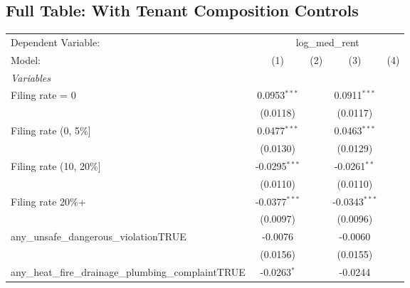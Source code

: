 \documentclass[
  11pt,
]{article}
\begin{document}
\begin{adjustbox}{max width=\textwidth}
\end{adjustbox}

\subsection{Full Table: With Tenant Composition
Controls}\label{full-table-with-tenant-composition-controls}

\begin{adjustbox}{max width=\textwidth}
\begingroup
\centering
\begin{tabular}{lcccc}
   \tabularnewline \midrule \midrule
   Dependent Variable: & \multicolumn{4}{c}{log\_med\_rent}\\
   Model:                                                  & (1)             & (2)             & (3)             & (4)\\  
   \midrule
   \emph{Variables}\\
   Filing rate = 0                                         & 0.0953$^{***}$  &                 & 0.0911$^{***}$  &   \\   
                                                           & (0.0118)        &                 & (0.0117)        &   \\   
   Filing rate (0, 5\%]                                    & 0.0477$^{***}$  &                 & 0.0463$^{***}$  &   \\   
                                                           & (0.0130)        &                 & (0.0129)        &   \\   
   Filing rate (10, 20\%]                                  & -0.0295$^{***}$ &                 & -0.0261$^{**}$  &   \\   
                                                           & (0.0110)        &                 & (0.0110)        &   \\   
   Filing rate 20\%+                                       & -0.0377$^{***}$ &                 & -0.0343$^{***}$ &   \\   
                                                           & (0.0097)        &                 & (0.0096)        &   \\   
   any\_unsafe\_dangerous\_violationTRUE                   & -0.0076         &                 & -0.0060         &   \\   
                                                           & (0.0156)        &                 & (0.0155)        &   \\   
   any\_heat\_fire\_drainage\_plumbing\_complaintTRUE      & -0.0263$^{*}$   &                 & -0.0244         &   \\   

\end{tabular}
\end{adjustbox}
\end{document}
